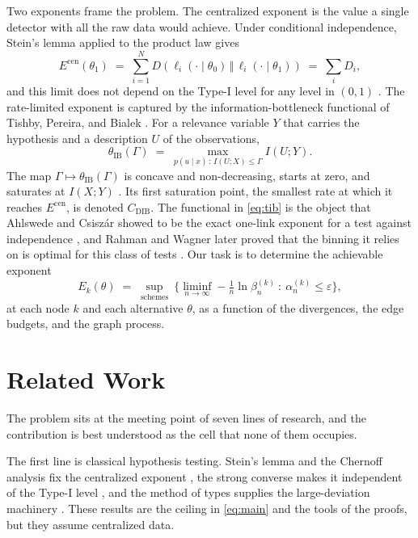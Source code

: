 \documentclass[journal]{IEEEtran}
\theoremstyle{definition}
\theoremstyle{remark}
\newcommand{\Ecen}{E^{\mathrm{cen}}}
\newcommand{\tib}{\theta_{\mathrm{IB}}}
\newcommand{\Cdib}{C_{\mathrm{DIB}}}
\newcommand{\KL}[2]{D\!\left(#1\,\Vert\,#2\right)}
\begin{document}
Two exponents frame the problem. The centralized exponent is the value a single detector with all the raw data
would achieve. Under conditional independence, Stein's lemma applied to the product law gives
\begin{equation}
\Ecen(\theta_1) \;=\; \sum_{i=1}^N \KL{\ell_i(\cdot\mid\theta_0)}{\ell_i(\cdot\mid\theta_1)} \;=\; \sum_i D_i,
\label{eq:ecen}
\end{equation}
and this limit does not depend on the Type-I level for any level in $(0,1)$ \cite{coverthomas2006,hankobayashi1989}.
The rate-limited exponent is captured by the information-bottleneck functional of Tishby, Pereira, and Bialek
\cite{tishby1999}. For a relevance variable $Y$ that carries the hypothesis and a description $U$ of the
observations,
\begin{equation}
\tib(\Gamma) \;=\; \max_{p(u\mid x)\,:\,I(U;X)\le \Gamma} I(U;Y). \label{eq:tib}
\end{equation}
The map $\Gamma\mapsto\tib(\Gamma)$ is concave and non-decreasing, starts at zero, and saturates at $I(X;Y)$
\cite{giladbachrach2003}. Its first saturation point, the smallest rate at which it reaches $\Ecen$, is denoted
$\Cdib$. The functional in \eqref{eq:tib} is the object that Ahlswede and Csisz\'ar showed to be the exact
one-link exponent for a test against independence \cite{ahlswedecsiszar1986}, and Rahman and Wagner later proved
that the binning it relies on is optimal for this class of tests \cite{rahmanwagner2012}. Our task is to determine
the achievable exponent
\begin{equation}
E_k(\theta) \;=\; \sup_{\text{schemes}}\ \Big\{\liminf_{n\to\infty} -\tfrac1n\ln\beta_n^{(k)} \ :\ \alpha_n^{(k)}\le\varepsilon\Big\},
\label{eq:Ek}
\end{equation}
at each node $k$ and each alternative $\theta$, as a function of the divergences, the edge budgets, and the graph
process.

\section{Related Work}\label{sec:related}
The problem sits at the meeting point of seven lines of research, and the contribution is best understood as the
cell that none of them occupies.

The first line is classical hypothesis testing. Stein's lemma and the Chernoff analysis fix the centralized
exponent \cite{chernoff1952,coverthomas2006}, the strong converse makes it independent of the Type-I level
\cite{hankobayashi1989,blahut1974}, and the method of types supplies the large-deviation machinery
\cite{csiszarkorner2011,csiszar1998types,dembozeitouni1998}. These results are the ceiling in \eqref{eq:main} and
the tools of the proofs, but they assume centralized data.
\end{document}
